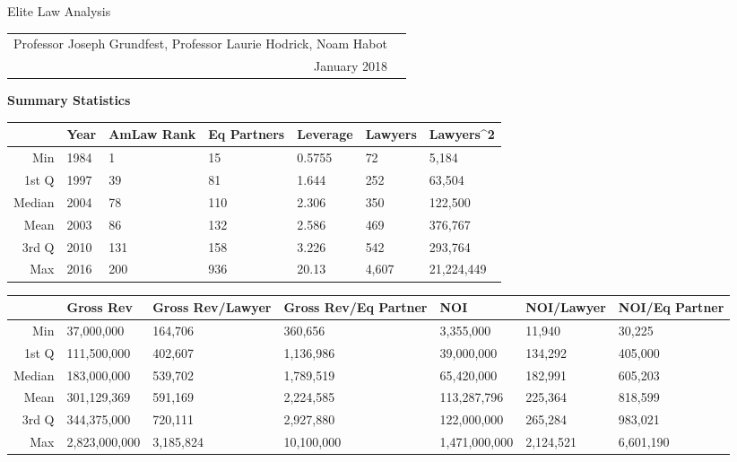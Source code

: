 \documentclass{article}
\begin{document}
\begin{center}{\LARGE Elite Law Analysis}
\\
\begin{tabular}{rl}\\Professor Joseph Grundfest, Professor Laurie Hodrick, Noam Habot \\January 2018\end{tabular}\end{center}{\large \textbf{Summary Statistics} }%
\begin{table}[H]
\centering
\begin{tabular}{rllllll}
  \hline
 & Year & AmLaw Rank & Eq Partners & Leverage & Lawyers & Lawyers^2 \\ 
  \hline
Min & 1984 & 1 & 15 & 0.5755 & 72 & 5,184 \\ 
  1st Q & 1997 & 39 & 81 & 1.644 & 252 & 63,504 \\ 
  Median & 2004 & 78 & 110 & 2.306 & 350 & 122,500 \\ 
  Mean & 2003 & 86 & 132 & 2.586 & 469 & 376,767 \\ 
  3rd Q & 2010 & 131 & 158 & 3.226 & 542 & 293,764 \\ 
  Max & 2016 & 200 & 936 & 20.13 & 4,607 & 21,224,449 \\ 
   \hline
\end{tabular}
\end{table}
\begin{table}[H]
\centering
\begin{tabular}{rllllll}
  \hline
 & Gross Rev & Gross Rev/Lawyer & Gross Rev/Eq Partner & NOI & NOI/Lawyer & NOI/Eq Partner \\ 
  \hline
Min & 37,000,000 & 164,706 & 360,656 & 3,355,000 & 11,940 & 30,225 \\ 
  1st Q & 111,500,000 & 402,607 & 1,136,986 & 39,000,000 & 134,292 & 405,000 \\ 
  Median & 183,000,000 & 539,702 & 1,789,519 & 65,420,000 & 182,991 & 605,203 \\ 
  Mean & 301,129,369 & 591,169 & 2,224,585 & 113,287,796 & 225,364 & 818,599 \\ 
  3rd Q & 344,375,000 & 720,111 & 2,927,880 & 122,000,000 & 265,284 & 983,021 \\ 
  Max & 2,823,000,000 & 3,185,824 & 10,100,000 & 1,471,000,000 & 2,124,521 & 6,601,190 \\ 
   \hline
\end{tabular}
\end{table}
\end{document}
